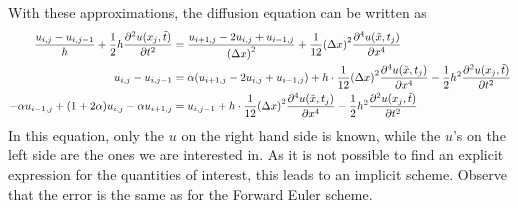 \documentclass[12pt,english,a4paper]{article}
\begin{document}
With these approximations, the diffusion equation can be written as
\begin{align*}
    \frac{u_{i,j}-u_{i,j-1}}{h} + \frac{1}{2}h\pdv[2]{u(x_j,\tilde{t})}{t}
    &= \frac{u_{i+1,j}  - 2u_{i,j} + u_{i-1,j}}{\qty(\Delta x)^2} + \frac{1}{12}\qty(\Delta x)^2\pdv[4]{u(\tilde{x},t_j)}{x}  \\
    u_{i,j}-u_{i,j-1} &= \alpha(u_{i+1,j}  - 2u_{i,j} + u_{i-1,j}) + h\cdot \frac{1}{12}\qty(\Delta x)^2\pdv[4]{u(\tilde{x},t_j)}{x}  - \frac{1}{2}h^2\pdv[2]{u(x_j,\tilde{t})}{t}\\
    -\alpha u_{i-1,j} + \qty(1+2\alpha)u_{i,j} - \alpha u_{i+1,j} &= u_{i,j-1} + h\cdot \frac{1}{12}\qty(\Delta x)^2\pdv[4]{u(\tilde{x},t_j)}{x}  - \frac{1}{2}h^2\pdv[2]{u(x_j,\tilde{t})}{t}
\end{align*}
In this equation, only the \(u\) on the right hand side is known, while the \(u\)'s on the left side are the ones we are interested in. As it is not possible to find an explicit expression for the quantities of interest, this leads to an implicit scheme. Observe that the error is the same as for the Forward Euler scheme.
\end{document}
